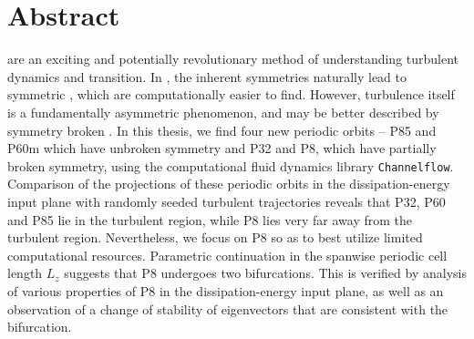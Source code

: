     \chapter*{Abstract}
	\Ecs are an exciting and potentially revolutionary method of understanding turbulent dynamics and transition. In \pCf, the inherent symmetries naturally lead to symmetric \ecs, which are computationally easier to find. However, turbulence itself is a fundamentally asymmetric phenomenon, and may be better described by symmetry broken \ecs. In this thesis, we find four new periodic orbits -- P85 and P60m which have unbroken symmetry and P32 and P8, which have partially broken symmetry, using the computational fluid dynamics library {\tt Channelflow}. Comparison of the projections of these periodic orbits in the dissipation-energy input plane with randomly seeded turbulent trajectories reveals that P32, P60 and P85 lie in the turbulent region, while P8 lies very far away from the turbulent region. Nevertheless, we focus on P8 so as to best utilize limited computational resources. Parametric continuation in the spanwise periodic cell length $L_z$ suggests that P8 undergoes two bifurcations. This is verified by analysis of various properties of P8 in the dissipation-energy input plane, as well as an observation of a change of stability of eigenvectors that are consistent with the bifurcation.   